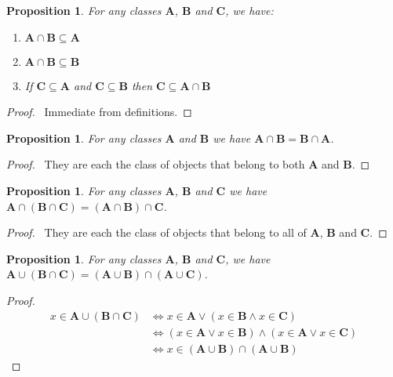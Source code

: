 \documentclass{article}
\let\qed\relax
\newtheorem{proposition}[axiom]{Proposition}
\theoremstyle{definition}
\begin{document}
    \begin{proposition}
        For any classes $\mathbf{A}$, $\mathbf{B}$ and $\mathbf{C}$, we have:
        \begin{enumerate}
            \item $\mathbf{A} \cap \mathbf{B} \subseteq \mathbf{A}$
            \item $\mathbf{A} \cap \mathbf{B} \subseteq \mathbf{B}$
            \item If $\mathbf{C} \subseteq \mathbf{A}$ and $\mathbf{C} \subseteq \mathbf{B}$
            then $\mathbf{C} \subseteq \mathbf{A} \cap \mathbf{B}$
        \end{enumerate}
    \end{proposition}

    \begin{proof}
        \pf\ Immediate from definitions. \qed
    \end{proof}

    \begin{proposition}
        For any classes $\mathbf{A}$ and $\mathbf{B}$ we have $\mathbf{A} \cap \mathbf{B}
        = \mathbf{B} \cap \mathbf{A}$.
    \end{proposition}

    \begin{proof}
        \pf\ They are each the class of objects that belong to both $\mathbf{A}$ and $\mathbf{B}$. \qed
    \end{proof}

    \begin{proposition}
        For any classes $\mathbf{A}$, $\mathbf{B}$ and $\mathbf{C}$ we have
        $\mathbf{A} \cap (\mathbf{B} \cap \mathbf{C}) = (\mathbf{A} \cap \mathbf{B}) \cap \mathbf{C}$.
    \end{proposition}

    \begin{proof}
        \pf\ They are each the class of objects that belong to all of $\mathbf{A}$,
        $\mathbf{B}$ and $\mathbf{C}$. \qed
    \end{proof}

    \begin{proposition}
        For any classes $\mathbf{A}$, $\mathbf{B}$ and $\mathbf{C}$, we have
        $\mathbf{A} \cup (\mathbf{B} \cap \mathbf{C}) = (\mathbf{A} \cup \mathbf{B}) \cap
        (\mathbf{A} \cup \mathbf{C})$.
    \end{proposition}

    \begin{proof}
        \pf
        \begin{align*}
            x \in \mathbf{A} \cup (\mathbf{B} \cap \mathbf{C})
            & \Leftrightarrow x \in \mathbf{A} \vee (x \in \mathbf{B} \wedge x \in \mathbf{C}) \\
            & \Leftrightarrow (x \in \mathbf{A} \vee x \in \mathbf{B}) \wedge (x \in \mathbf{A} \vee x \in \mathbf{C}) \\
            & \Leftrightarrow x \in (\mathbf{A} \cup \mathbf{B}) \cap (\mathbf{A} \cup \mathbf{B})
        \end{align*}
    \end{proof}
\end{document}
